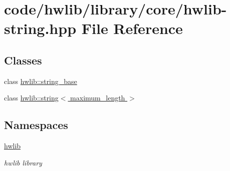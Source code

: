 \hypertarget{hwlib-string_8hpp}{}\section{code/hwlib/library/core/hwlib-\/string.hpp File Reference}
\label{hwlib-string_8hpp}
\subsection*{Classes}
\begin{DoxyCompactItemize}
\item 
class \hyperlink{classhwlib_1_1string__base}{hwlib\+::string\+\_\+base}
\item 
class \hyperlink{classhwlib_1_1string}{hwlib\+::string$<$ maximum\+\_\+length $>$}
\end{DoxyCompactItemize}
\subsection*{Namespaces}
\begin{DoxyCompactItemize}
\item 
 \hyperlink{namespacehwlib}{hwlib}
\begin{DoxyCompactList}\small\item\em hwlib library \end{DoxyCompactList}\end{DoxyCompactItemize}
